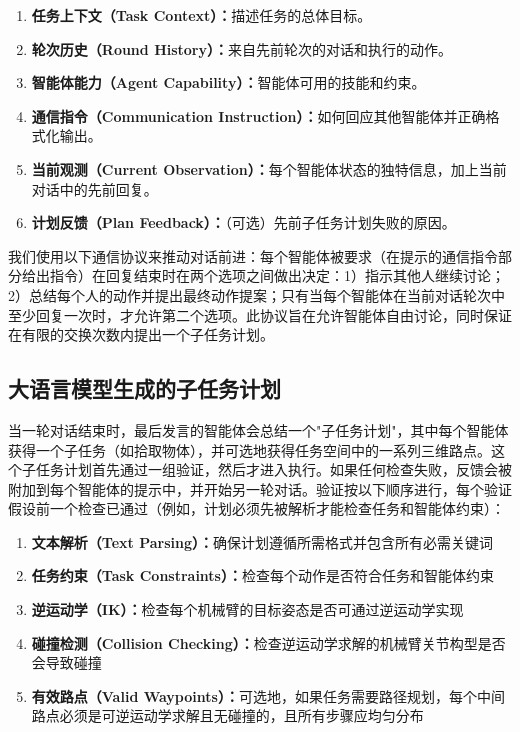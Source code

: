 \documentclass[UTF8, a4paper, 12pt]{article}
\begin{document}
\begin{enumerate}
    \item \textbf{任务上下文（Task Context）：}描述任务的总体目标。
    \item \textbf{轮次历史（Round History）：}来自先前轮次的对话和执行的动作。
    \item \textbf{智能体能力（Agent Capability）：}智能体可用的技能和约束。
    \item \textbf{通信指令（Communication Instruction）：}如何回应其他智能体并正确格式化输出。
    \item \textbf{当前观测（Current Observation）：}每个智能体状态的独特信息，加上当前对话中的先前回复。
    \item \textbf{计划反馈（Plan Feedback）：}（可选）先前子任务计划失败的原因。
\end{enumerate}

我们使用以下通信协议来推动对话前进：每个智能体被要求（在提示的通信指令部分给出指令）在回复结束时在两个选项之间做出决定：1）指示其他人继续讨论；2）总结每个人的动作并提出最终动作提案；只有当每个智能体在当前对话轮次中至少回复一次时，才允许第二个选项。此协议旨在允许智能体自由讨论，同时保证在有限的交换次数内提出一个子任务计划。

\subsection{大语言模型生成的子任务计划}

当一轮对话结束时，最后发言的智能体会总结一个"子任务计划"，其中每个智能体获得一个子任务（如拾取物体），并可选地获得任务空间中的一系列三维路点。这个子任务计划首先通过一组验证，然后才进入执行。如果任何检查失败，反馈会被附加到每个智能体的提示中，并开始另一轮对话。验证按以下顺序进行，每个验证假设前一个检查已通过（例如，计划必须先被解析才能检查任务和智能体约束）：

\begin{enumerate}
    \item \textbf{文本解析（Text Parsing）：}确保计划遵循所需格式并包含所有必需关键词
    \item \textbf{任务约束（Task Constraints）：}检查每个动作是否符合任务和智能体约束
    \item \textbf{逆运动学（IK）：}检查每个机械臂的目标姿态是否可通过逆运动学实现
    \item \textbf{碰撞检测（Collision Checking）：}检查逆运动学求解的机械臂关节构型是否会导致碰撞
    \item \textbf{有效路点（Valid Waypoints）：}可选地，如果任务需要路径规划，每个中间路点必须是可逆运动学求解且无碰撞的，且所有步骤应均匀分布
\end{enumerate}
\end{document}
